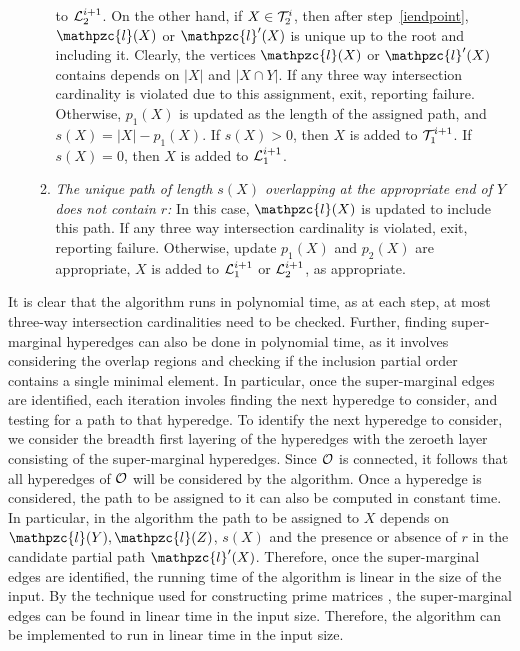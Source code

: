 \documentclass[11pt,
               envcountsect,
               envcountsame]
               {../lib/llncs2e/llncs}
\def\cL{{\cal L}}
\def\cO{{\cal O}}
\def\cT{{\cal T}}
\def\cl{\mathpzc{l}}
\begin{document}
\begin{enumerate}[I.]
\begin{enumerate}
    to $\cL_2^{i+1}$.  On the other hand, if $X \in \cT_2^i$, then
    after step~\ref{iendpoint}, $\cl(X)$ or $\cl'(X)$ is unique up to
    the root and including it. Clearly, the vertices $\cl(X)$ or
    $\cl'(X)$ contains depends on $|X|$ and $|X \cap Y|$.  If any
    three way intersection cardinality is violated due to this
    assignment, exit, reporting failure.  Otherwise,
    $p_1(X)$ is updated as the length of the assigned path, and $s(X)
    = |X|-p_1(X)$.  If $s(X) > 0$, then $X$ is added to $\cT_1^{i+1}$.
    If $s(X)=0$, then $X$ is added to $\cL_1^{i+1}$.
  \item {\em The unique path of length $s(X)$ overlapping at the
      appropriate end of $Y$ does not contain $r$:} In this case,
    $\cl(X)$ is updated to include this path.  If any three way
    intersection cardinality is violated, exit, reporting failure.
    Otherwise, update $p_1(X)$ and $p_2(X)$ are appropriate, $X$ is
    added to $\cL_1^{i+1}$ or $\cL_2^{i+1}$, as appropriate.
  \end{enumerate}
\end{enumerate}

 It
is clear that the algorithm runs in polynomial time, as at each step,
at most three-way intersection cardinalities need to be checked.
Further, finding super-marginal hyperedges can also be done in
polynomial time, as it involves considering the overlap regions and
checking if the inclusion partial order contains a single minimal
element.  In particular, once the super-marginal edges are identified,
each iteration involes finding the next hyperedge to consider, and
testing for a path to that hyperedge.  To identify the next hyperedge
to consider, we consider the breadth first layering of the hyperedges
with the zeroeth layer consisting of the super-marginal hyperedges.
Since $\cO$ is connected, it follows that all hyperedges of $\cO$ will
be considered by the algorithm.  Once a hyperedge is considered, the
path to be assigned to it can also be computed in constant time.  In
particular, in the algorithm the path to be assigned to $X$ depends on
$\cl(Y), \cl(Z)$, $s(X)$ and the presence or absence of $r$ in the
candidate partial path $\cl'(X)$.  Therefore, once the super-marginal
edges are identified, the running time of the algorithm is linear in
the size of the input.  By the technique used for constructing prime
matrices \cite{wlh02}, the super-marginal edges can be found in linear
time in the input size.  Therefore, the algorithm can be implemented
to run in linear time in the input size.
\end{document}
